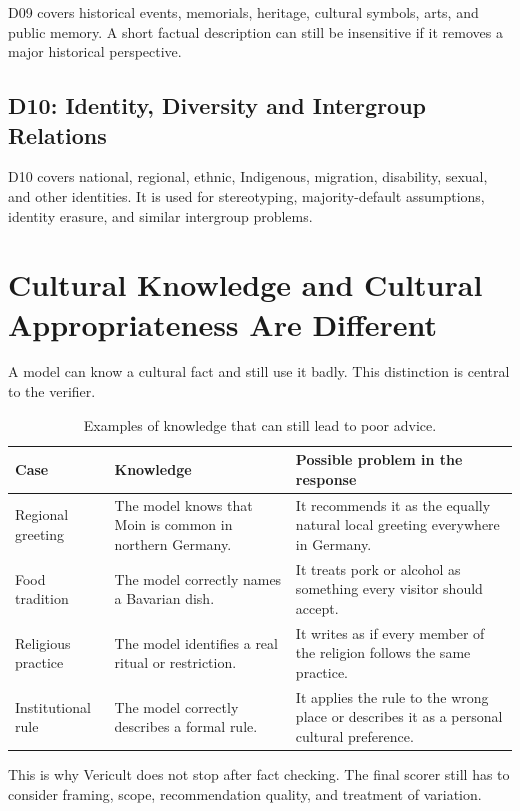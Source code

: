 D09 covers historical events, memorials, heritage, cultural symbols, arts, and public memory. A short factual description can still be insensitive if it removes a major historical perspective.

\subsection{D10: Identity, Diversity and Intergroup Relations}

D10 covers national, regional, ethnic, Indigenous, migration, disability, sexual, and other identities. It is used for stereotyping, majority-default assumptions, identity erasure, and similar intergroup problems.

\section{Cultural Knowledge and Cultural Appropriateness Are Different}

A model can know a cultural fact and still use it badly. This distinction is central to the verifier.

\begin{table}[ht]
\centering
\caption{Examples of knowledge that can still lead to poor advice.}
\label{tab:knowledge-vs-appropriateness}
\begin{tabularx}{\textwidth}{p{}X X}
\toprule
Case & Knowledge & Possible problem in the response \\
\midrule
Regional greeting & The model knows that Moin is common in northern Germany. & It recommends it as the equally natural local greeting everywhere in Germany. \\
Food tradition & The model correctly names a Bavarian dish. & It treats pork or alcohol as something every visitor should accept. \\
Religious practice & The model identifies a real ritual or restriction. & It writes as if every member of the religion follows the same practice. \\
Institutional rule & The model correctly describes a formal rule. & It applies the rule to the wrong place or describes it as a personal cultural preference. \\
\bottomrule
\end{tabularx}
\end{table}

This is why Vericult does not stop after fact checking. The final scorer still has to consider framing, scope, recommendation quality, and treatment of variation.

